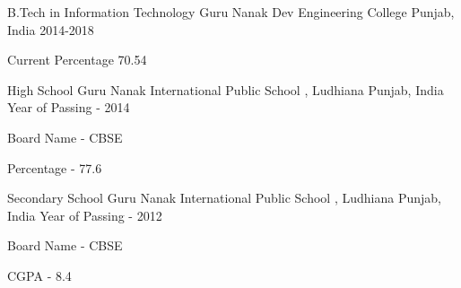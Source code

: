 


\begin{cventries}


\cventry
{B.Tech in Information Technology} %
{Guru Nanak Dev Engineering College} %
{Punjab, India} %
{2014-2018} %
{ %
\begin{cvitems}
\item {Current Percentage 70.54}
\end{cvitems}
}
 

\end{cventries}
\begin{cventries}


\cventry
{High School} %
{Guru Nanak International Public School , Ludhiana} %
{Punjab, India} %
{Year of Passing - 2014} %
{ %
\begin{cvitems}
\item {Board Name - CBSE}
\item {Percentage - 77.6}
\end{cvitems}}
\end{cventries}
\begin{cventries}

\cventry
{Secondary School} %
{Guru Nanak International Public School , Ludhiana} %
{Punjab, India} %
{Year of Passing - 2012} %
{ %
\begin{cvitems}
\item {Board Name - CBSE}
\item {CGPA - 8.4}
\end{cvitems}
}
 

\end{cventries}